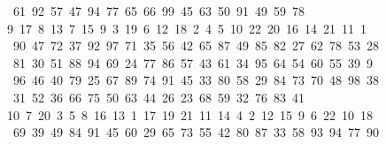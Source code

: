 \begin{tabbing}
\>\ 61\ 92\ 57\ 47\ 94\ 77\ 65\ 66\ 99\ 45\ 63\ 50\ 91\ 49\ 59\ 78\\[0pt]
9\ 17\ 8\ 13\ 7\ 15\ 9\ 3\ 19\ 6\ 12\ 18\ 2\ 4\ 5\ 10\ 22\ 20\ 16\ 14\ 21\ 11\ 1\\[0pt]
\>\ 90\ 47\ 72\ 37\ 92\ 97\ 71\ 35\ 56\ 42\ 65\ 87\ 49\ 85\ 82\ 27\ 62\ 78\ 53\ 28\ \\[0pt]
\ 81\ 30\ 51\ 88\ 94\ 69\ 24\ 77\ 86\ 57\ 43\ 61\ 34\ 95\ 64\ 54\ 60\ 55\ 39\ 9\\[0pt]
\ 96\ 46\ 40\ 79\ 25\ 67\ 89\ 74\ 91\ 45\ 33\ 80\ 58\ 29\ 84\ 73\ 70\ 48\ 98\ 38\\[0pt]
\>\ 31\ 52\ 36\ 66\ 75\ 50\ 63\ 44\ 26\ 23\ 68\ 59\ 32\ 76\ 83\ 41\\[0pt]
10\ 7\ 20\ 3\ 5\ 8\ 16\ 13\ 1\ 17\ 19\ 21\ 11\ 14\ 4\ 2\ 12\ 15\ 9\ 6\ 22\ 10\ 18\\[0pt]
\>\ 69\ 39\ 49\ 84\ 91\ 45\ 60\ 29\ 65\ 73\ 55\ 42\ 80\ 87\ 33\ 58\ 93\ 94\ 77\ 90\ \\[0pt]

\end{tabbing}

